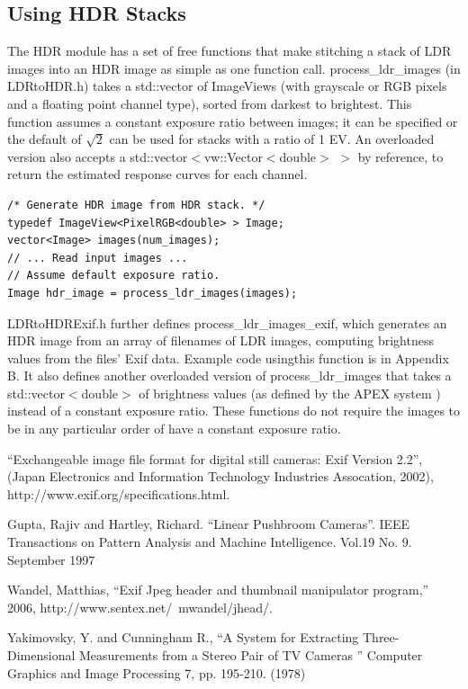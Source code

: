 \subsection{Using HDR Stacks}
The HDR module has a set of free functions that make stitching a stack of LDR
images into an HDR image as simple as one function call. process\_ldr\_images (in 
LDRtoHDR.h) takes a std::vector of ImageViews (with grayscale or RGB pixels
and a floating point channel type), sorted from darkest to brightest. This
function assumes a constant exposure ratio between images; it can be specified
or the default of $\sqrt{2}$ can be used for stacks with a ratio of 1 EV. An
overloaded version also accepts a std::vector$<$vw::Vector$<$double$>$ $>$ by reference,
to return the estimated response curves for each channel.

\begin{verbatim}
/* Generate HDR image from HDR stack. */
typedef ImageView<PixelRGB<double> > Image;
vector<Image> images(num_images);
// ... Read input images ...
// Assume default exposure ratio.
Image hdr_image = process_ldr_images(images);
\end{verbatim}

LDRtoHDRExif.h further defines process\_ldr\_images\_exif, which generates an HDR
image from an array of filenames of LDR images, computing brightness values
from the files' Exif data. Example code usingthis function is in Appendix B. It
also defines another overloaded version of process\_ldr\_images that takes a
std::vector$<$double$>$ of brightness values (as defined by the APEX system \cite{apex})
instead of a constant exposure ratio. These functions do not require the images
to be in any particular order of have a constant exposure ratio.

\begin{thebibliography}{1}

 ``Exchangeable image file format for digital still cameras: Exif Version 2.2'',
(Japan Electronics and Information Technology Industries Assocation, 2002),
http://www.exif.org/specifications.html.

 Gupta, Rajiv and Hartley, Richard. ``Linear Pushbroom Cameras''.  IEEE
 Transactions on Pattern Analysis and Machine Intelligence. Vol.19 No. 9. September 1997

 Wandel, Matthias, ``Exif Jpeg header and thumbnail manipulator program,'' 2006,
http://www.sentex.net/~mwandel/jhead/.

  Yakimovsky, Y. and Cunningham R., ``A System for Extracting
  Three-Dimensional Measurements from a Stereo Pair of TV Cameras ''
  Computer Graphics and Image Processing 7, pp. 195-210. (1978)

\end{thebibliography}

